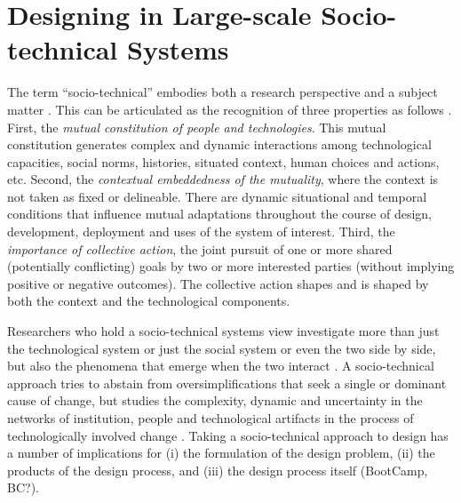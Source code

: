 \section{Designing in Large-scale Socio-technical Systems}
\label{sec:design}

The term ``socio-technical'' embodies both a research perspective and a subject matter \cite{Lee2001}.
This can be articulated as the recognition of three properties as follows \cite{Sawyer2014}. 
%
First, the \textit{mutual constitution of people and technologies}. This mutual constitution generates complex and dynamic interactions among technological capacities, social norms, histories, situated context, human choices and actions, etc. 
%
Second, the \textit{contextual embeddedness of the mutuality}, where the context is not taken as fixed or delineable. There are dynamic situational and temporal conditions that influence 
mutual adaptations throughout the course of design, development, deployment and uses of the system of interest. 
% 
Third, the \textit{importance of collective action}, the joint pursuit of one or more shared (potentially conflicting) goals by two or more interested parties (without implying positive or negative outcomes). The collective action shapes and is shaped by both the context and the technological components. 

Researchers who hold a socio-technical systems view investigate more than just the technological system or just the social system or even the two side by side, but also the phenomena that emerge when the two interact \cite{Lee2001}. A socio-technical approach tries to abstain from oversimplifications that seek a single or dominant cause of change, but studies the complexity, dynamic and uncertainty in the networks of institution, people and technological artifacts in the process of technologically involved change \cite{Sawyer2014}. 
%
Taking a socio-technical approach to design has a number of implications for (i) the formulation of the design problem, (ii) the products of the design process, and (iii) the design process itself (BootCamp, BC?).

